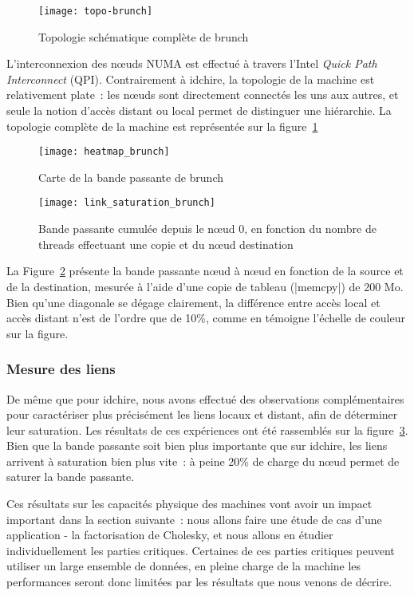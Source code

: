 \begin{figure}[ht]
  \centering
  \texttt{[image: topo-brunch]}
  \caption{Topologie schématique complète de brunch}\label{fig:contribs:machines:brunch:topo-liens}
\end{figure}

L'interconnexion des nœuds NUMA est effectué à travers l'Intel \emph{Quick Path Interconnect} (QPI).
Contrairement à idchire, la topologie de la machine est relativement plate~: les nœuds sont directement connectés les uns aux autres, et seule la notion d'accès distant ou local permet de distinguer une hiérarchie.
La topologie complète de la machine est représentée sur la figure~\ref{fig:contribs:machines:brunch:topo-liens}

\begin{figure}[t!]
  \centering
  \texttt{[image: heatmap\_brunch]}
  \caption{Carte de la bande passante de brunch}\label{fig:contribs:machines:brunch:heatmap}
\end{figure}
\begin{figure}[h!]
  \centering
  \texttt{[image: link\_saturation\_brunch]}
  \caption{Bande passante cumulée depuis le nœud 0, en fonction du nombre de threads effectuant une copie et du nœud destination}\label{fig:contribs:machines:brunch:saturation}
\end{figure}


La Figure~\ref{fig:contribs:machines:brunch:heatmap} présente la bande passante nœud à nœud en fonction de la source et de la destination, mesurée à l'aide d'une copie de tableau (|memcpy|) de 200 Mo.
Bien qu'une diagonale se dégage clairement, la différence entre accès local et accès distant n'est de l'ordre que de 10\%, comme en témoigne l'échelle de couleur sur la figure.

\subsubsection{Mesure des liens}

De même que pour idchire, nous avons effectué des observations complémentaires pour caractériser plus précisément les liens locaux et distant, afin de déterminer leur saturation.
Les résultats de ces expériences ont été rassemblés sur la figure~\ref{fig:contribs:machines:brunch:saturation}.
Bien que la bande passante soit bien plus importante que sur idchire, les liens arrivent à saturation bien plus vite~: à peine 20\% de charge du nœud permet de saturer la bande passante.

\bigskip
\bigskip

Ces résultats sur les capacités physique des machines vont avoir un impact important dans la section suivante~: nous allons faire une étude de cas d'une application - la factorisation de Cholesky, et nous allons en étudier individuellement les parties critiques.
Certaines de ces parties critiques peuvent utiliser un large ensemble de données, en pleine charge de la machine les performances seront donc limitées par les résultats que nous venons de décrire.

